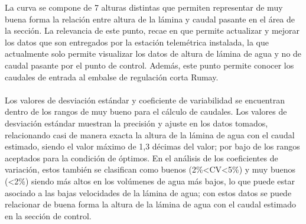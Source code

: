 \documentclass[]{article}
\begin{document}
La curva se compone de 7 alturas distintas que permiten representar de muy buena forma la relación entre altura de la lámina y caudal pasante en el área de la sección. La relevancia de este punto, recae en que permite actualizar y mejorar los datos que son entregados por la estación telemétrica instalada, la que actualmente solo permite visualizar los datos de altura de lámina de agua y no de caudal pasante por el punto de control. Además, este punto permite conocer los caudales de entrada al embalse de regulación corta Rumay. \\
\\ 
Los valores de desviación estándar y coeficiente de variabilidad se encuentran dentro de los rangos de muy bueno para el cálculo de caudales. Los valores de desviación estándar muestran la precisión y ajuste en los datos tomados, relacionando casi de manera exacta la altura de la lámina de agua con el caudal estimado, siendo el valor máximo de 1,3 décimas del valor; por bajo de los rangos aceptados para la condición de óptimos. En el análisis de los coeficientes de variación, estos también se clasifican como buenos (2\%<CV<5\%) y muy buenos (<2\%) siendo más altos en los volúmenes de agua más bajos, lo que puede estar asociado a las bajas velocidades de la lámina de agua; con estos datos se puede relacionar de buena forma la altura de la lámina de agua con el caudal estimado en la sección de control.
\end{document}
